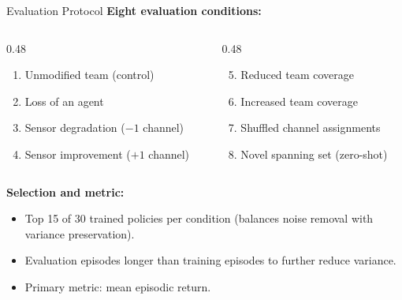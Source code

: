 \begin{frame}{Evaluation Protocol}
    \textbf{Eight evaluation conditions:}
    \begin{columns}
        \begin{column}{0.48\textwidth}
            \begin{enumerate}
                \item Unmodified team (control)
                \item Loss of an agent
                \item Sensor degradation ($-1$ channel)
                \item Sensor improvement ($+1$ channel)
            \end{enumerate}
        \end{column}
        \begin{column}{0.48\textwidth}
            \begin{enumerate}
                \setcounter{enumi}{4}
                \item Reduced team coverage
                \item Increased team coverage
                \item Shuffled channel assignments
                \item Novel spanning set (zero-shot)
            \end{enumerate}
        \end{column}
    \end{columns}

    \vspace{1em}
    \textbf{Selection and metric:}
    \begin{itemize}
        \item Top 15 of 30 trained policies per condition
            (balances noise removal with variance preservation).
        \item Evaluation episodes longer than training episodes
            to further reduce variance.
        \item Primary metric: mean episodic return.
    \end{itemize}


\end{frame}


